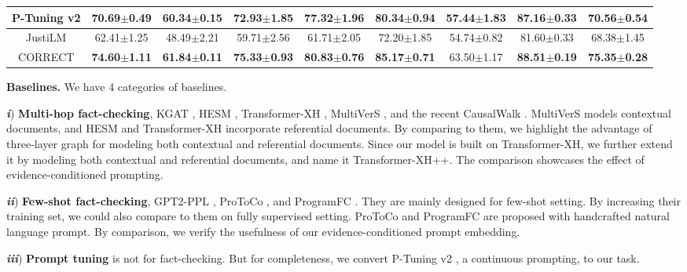 \begin{table*}[t]
{\begin{tabular}{c|cc|cc|cc|cc}
                \hline
                P-Tuning v2 & 70.69$ \pm $0.49 & 60.34$ \pm $0.15 & 72.93$ \pm $1.85 & 77.32$ \pm $1.96 & 80.34$ \pm $0.94 & 57.44$ \pm $1.83 & 87.16$ \pm $0.33 & 70.56$ \pm $0.54 \\
                \hline
                JustiLM & 62.41$ \pm $1.25 & 48.49$ \pm $2.21 & 59.71$ \pm $2.56 & 61.71$ \pm $2.05 & 72.20$ \pm $1.85 & 54.74$ \pm $0.82 & 81.60$ \pm $0.33 & 68.38$ \pm $1.45 \\
                \hline
                CORRECT & \textbf{74.60}$ \pm $\textbf{1.11} & \textbf{61.84}$ \pm $\textbf{0.11} & \textbf{75.33}$ \pm $\textbf{0.93} & \textbf{80.83}$ \pm $\textbf{0.76} & \textbf{85.17}$ \pm $\textbf{0.71} & 63.50$ \pm $1.17 & \textbf{88.51}$ \pm $\textbf{0.19} & \textbf{75.35}$ \pm $\textbf{0.28} \\
			\bottomrule
		\end{tabular}
	}
	\label{table:fully_supervised_micro_f1}
\end{table*}

\textbf{Baselines.} We have 4 categories of baselines. 

\emph{\textbf{i}}) \textbf{Multi-hop fact-checking}, KGAT \cite{kgat}, HESM \cite{hesm}, Transformer-XH \cite{transformer_xh}, MultiVerS \cite{multivers}, and the recent CausalWalk \cite{causalwalk}. MultiVerS models contextual documents, and HESM and Transformer-XH incorporate referential documents. By comparing to them, we highlight the advantage of three-layer graph for modeling both contextual and referential documents. Since our model is built on Transformer-XH, we further extend it by modeling both contextual and referential documents, and name it Transformer-XH++. The comparison showcases the effect of evidence-conditioned prompting.

\emph{\textbf{ii}}) \textbf{Few-shot fact-checking}, GPT2-PPL \cite{gpt2_ppl}, ProToCo \cite{protoco}, and ProgramFC \cite{programfc}. They are mainly designed for few-shot setting. By increasing their training set, we could also compare to them on fully supervised setting. ProToCo and ProgramFC are proposed with handcrafted natural language prompt. By comparison, we verify the usefulness of our evidence-conditioned prompt embedding.

\emph{\textbf{iii}}) \textbf{Prompt tuning} is not for fact-checking. But for completeness, we convert P-Tuning v2 \cite{p_tuning_v2}, a continuous prompting, to our task.

